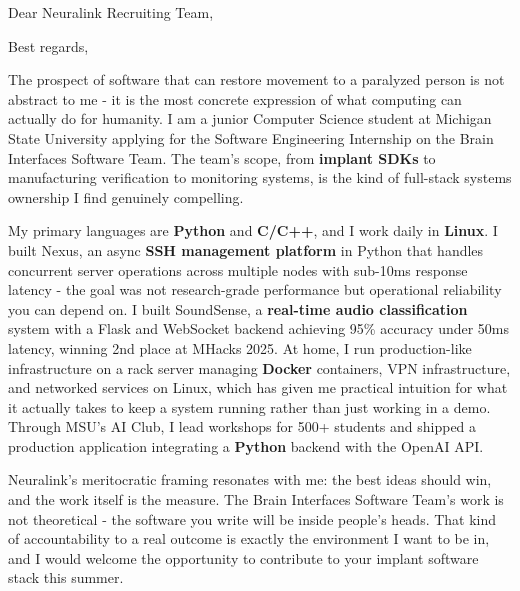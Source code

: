 \documentclass[11pt,letterpaper,sans]{moderncv}
\begin{document}
\date{\today}
\opening{Dear Neuralink Recruiting Team,}
\closing{Best regards,}
\makelettertitle

The prospect of software that can restore movement to a paralyzed person is not abstract to me - it is the most concrete expression of what computing can actually do for humanity. I am a junior Computer Science student at Michigan State University applying for the Software Engineering Internship on the Brain Interfaces Software Team. The team's scope, from \textbf{implant SDKs} to manufacturing verification to monitoring systems, is the kind of full-stack systems ownership I find genuinely compelling.

My primary languages are \textbf{Python} and \textbf{C/C++}, and I work daily in \textbf{Linux}. I built Nexus, an async \textbf{SSH management platform} in Python that handles concurrent server operations across multiple nodes with sub-10ms response latency - the goal was not research-grade performance but operational reliability you can depend on. I built SoundSense, a \textbf{real-time audio classification} system with a Flask and WebSocket backend achieving 95\% accuracy under 50ms latency, winning 2nd place at MHacks 2025. At home, I run production-like infrastructure on a rack server managing \textbf{Docker} containers, VPN infrastructure, and networked services on Linux, which has given me practical intuition for what it actually takes to keep a system running rather than just working in a demo. Through MSU's AI Club, I lead workshops for 500+ students and shipped a production application integrating a \textbf{Python} backend with the OpenAI API.

Neuralink's meritocratic framing resonates with me: the best ideas should win, and the work itself is the measure. The Brain Interfaces Software Team's work is not theoretical - the software you write will be inside people's heads. That kind of accountability to a real outcome is exactly the environment I want to be in, and I would welcome the opportunity to contribute to your implant software stack this summer.

\makeletterclosing
\end{document}

